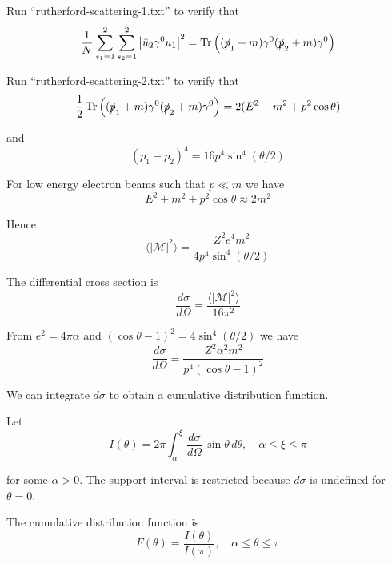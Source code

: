 \documentclass[12pt]{article}
\begin{document}
\noindent
Run ``rutherford-scattering-1.txt'' to verify that
$$
\frac{1}{N}\sum_{s_1=1}^2\sum_{s_2=1}^2\left|\bar{u}_2\gamma^0 u_1\right|^2
=\mathop{\rm Tr}\left((\slashed{p}_1+m)\gamma^0(\slashed{p}_2+m)\gamma^0\right)
$$

\noindent
Run ``rutherford-scattering-2.txt'' to verify that
$$
\frac{1}{2}
\mathop{\rm Tr}\left((\slashed{p}_1+m)\gamma^0(\slashed{p}_2+m)\gamma^0\right)
=2(E^2+m^2+p^2\cos\theta)
$$

\noindent
and
\begin{equation*}
(p_1-p_2)^4=16p^4\sin^4(\theta/2)
\end{equation*}

\noindent
For low energy electron beams such that $p\ll m$ we have
\begin{equation*}
E^2+m^2+p^2\cos\theta\approx2m^2
\end{equation*}

\noindent
Hence
\begin{equation*}
\langle|\mathcal{M}|^2\rangle=\frac{Z^2e^4m^2}{4p^4\sin^4(\theta/2)}
\end{equation*}

\noindent
The differential cross section is
\begin{equation*}
\frac{d\sigma}{d\Omega}=\frac{\langle|\mathcal{M}|^2\rangle}{16\pi^2}
\end{equation*}

\noindent
From $e^2=4\pi\alpha$ and $(\cos\theta-1)^2=4\sin^4(\theta/2)$ we have
\begin{equation*}
\frac{d\sigma}{d\Omega}
=\frac{Z^2\alpha^2m^2}{p^4(\cos\theta-1)^2}
\end{equation*}

\newpage
\noindent
We can integrate $d\sigma$ to obtain a cumulative distribution function.

\bigskip
\noindent
Let
\begin{equation*}
I(\theta)=2\pi\int_\alpha^\xi\frac{d\sigma}{d\Omega}\,\sin\theta\,d\theta,
\quad\alpha\le\xi\le\pi
\end{equation*}

\noindent
for some $\alpha>0$.
The support interval is restricted because $d\sigma$ is undefined for $\theta=0$.

\bigskip
\noindent
The cumulative distribution function is
\begin{equation*}
F(\theta)=\frac{I(\theta)}{I(\pi)},
\quad\alpha\le\theta\le\pi
\end{equation*}
\end{document}
